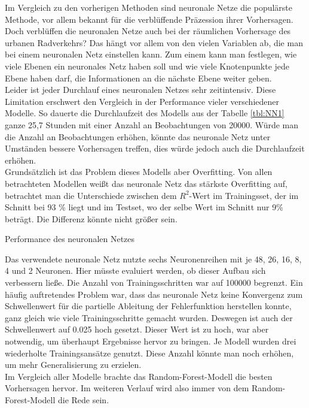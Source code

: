 \documentclass[a4paper,12pt]{thesis}
\begin{document}
Im Vergleich zu den vorherigen Methoden sind neuronale Netze die populärste Methode, vor allem bekannt für die verblüffende Präzession ihrer Vorhersagen. Doch verblüffen die neuronalen Netze auch bei der räumlichen Vorhersage des urbanen Radverkehrs? Das hängt vor allem von den vielen Variablen ab, die man bei einem neuronalen Netz einstellen kann. Zum einem kann man festlegen, wie viele Ebenen ein neuronales Netz haben soll und wie viele Knotenpunkte jede Ebene haben darf, die Informationen an die nächste Ebene weiter geben.\\
Leider ist jeder Durchlauf eines neuronalen Netzes sehr zeitintensiv. Diese Limitation erschwert den Vergleich in der Performance vieler verschiedener Modelle. So dauerte die Durchlaufzeit des Modells aus der Tabelle \ref{tbl:NN1} ganze 25,7 Stunden mit einer Anzahl an Beobachtungen von 20000. Würde man die Anzahl an Beobachtungen erhöhen, könnte das neuronale Netz unter Umständen bessere Vorhersagen treffen, dies würde jedoch auch die Durchlaufzeit erhöhen.\\
Grundsätzlich ist das Problem dieses Modells aber Overfitting. Von allen betrachteten Modellen weißt das neuronale Netz das stärkste Overfitting auf, betrachtet man die Unterschiede zwischen dem $R^2$-Wert im Trainingsset, der im Schnitt bei 93 \% liegt und im Testset, wo der selbe Wert im Schnitt nur 9\% beträgt. Die Differenz könnte nicht größer sein.

\begin{table}
	\caption{Performance des neuronalen Netzes}
	\label{tbl:NN1}
\end{table}

Das verwendete neuronale Netz nutzte sechs Neuronenreihen mit je 48, 26, 16, 8, 4 und 2 Neuronen. Hier müsste evaluiert werden, ob dieser Aufbau sich verbessern ließe. Die Anzahl von Trainingsschritten war auf 100000 begrenzt. Ein häufig auftretendes Problem war, dass das neuronale Netz keine Konvergenz zum Schwellenwert für die partielle Ableitung der Fehlerfunktion herstellen konnte, ganz gleich wie viele Trainingsschritte gemacht wurden. Deswegen ist auch der Schwellenwert auf 0.025 hoch gesetzt. Dieser Wert ist zu hoch, war aber notwendig, um überhaupt Ergebnisse hervor zu bringen. Je Modell wurden drei wiederholte Trainingsansätze genutzt. Diese Anzahl könnte man noch erhöhen, um mehr Generalisierung zu erzielen.\\
Im Vergleich aller Modelle brachte das Random-Forest-Modell die besten Vorhersagen hervor. Im weiteren Verlauf wird also immer von dem Random-Forest-Modell die Rede sein.
\end{document}
